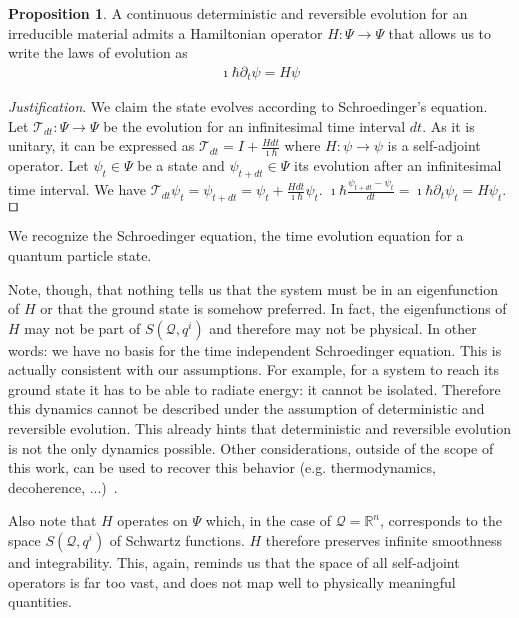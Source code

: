 \documentclass[smallextended]{svjour3}
\numberwithin{equation}{section}
\newenvironment{justification}{\emph{Justification}.}{\hfill\(\qed\)}
\theoremstyle{definition}
\newtheorem{prop}[equation]{Proposition}
\newenvironment{justification}{\emph{Justification}.}{\qed}
\begin{document}
	
\begin{prop}\label{prop:schroedinger_equation}
	A continuous deterministic and reversible evolution for an irreducible material admits a Hamiltonian operator $H : \Psi \rightarrow \Psi$ that allows us to write the laws of evolution as
	\begin{align*}
	\imath \hbar \partial_t \psi = H \psi
	\end{align*}
\end{prop}

\begin{justification}
	We claim the state evolves according to Schroedinger's equation. Let  $\mathcal{T}_{dt}: \Psi \rightarrow \Psi$ be the evolution for an infinitesimal time interval $dt$. As it is unitary, it can be expressed as $\mathcal{T}_{dt} = I + \frac{H dt}{\imath \hbar}$ where $H : \psi \rightarrow \psi$ is a self-adjoint operator. Let $\psi_t \in \Psi$ be a state and $\psi_{t+dt} \in \Psi$ its evolution after an infinitesimal time interval. We have $\mathcal{T}_{dt} \psi_t = \psi_{t+dt} = \psi_t + \frac{H dt}{\imath \hbar} \psi_t$. $\imath \hbar \frac{\psi_{t+dt} - \psi_t}{dt} = \imath \hbar \partial_t \psi_t = H\psi_t$.
\end{justification}

We recognize the Schroedinger equation, the time evolution equation for a quantum particle state.

Note, though, that nothing tells us that the system must be in an eigenfunction of $H$ or that the ground state is somehow preferred. In fact, the eigenfunctions of $H$ may not be part of $S(\mathcal{Q}, q^i)$ and therefore may not be physical. In other words: we have no basis for the time independent Schroedinger equation. This is actually consistent with our assumptions. For example, for a system to reach its ground state it has to be able to radiate energy: it cannot be isolated. Therefore this dynamics cannot be described under the assumption of deterministic and reversible evolution. This already hints that deterministic and reversible evolution is not the only dynamics possible. Other considerations, outside of the scope of this work, can be used to recover this behavior (e.g. thermodynamics, decoherence, ...)~\cite{Weiss}.

Also note that $H$ operates on $\Psi$ which, in the case of $\mathcal{Q}=\mathbb{R}^n$, corresponds to the space $S(\mathcal{Q}, q^i)$ of Schwartz functions. $H$ therefore preserves infinite smoothness and integrability. This, again, reminds us that the space of all self-adjoint operators is far too vast, and does not map well to physically meaningful quantities.
\end{document}
